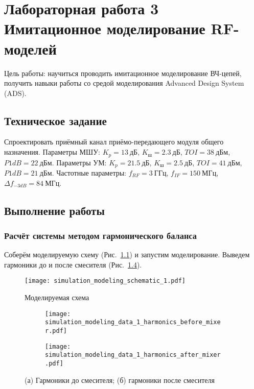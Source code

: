 \chapter{Лабораторная работа 3 \\
Имитационное моделирование RF-моделей}

Цель работы: научиться проводить имитационное моделирование ВЧ-цепей, получить навыки работы со средой моделирования Advanced Design System (ADS).

\section{Техническое задание}

Спроектировать приёмный канал приёмо-передающего модуля общего назначения.
Параметры МШУ: $K_p = 13~\text{дБ}$, $K_\text{ш} = 2.3~\text{дБ}$, $TOI = 38~\text{дБм}$, $P1dB = 22~\text{дБм}$.
Параметры УМ: $K_p = 21.5~\text{дБ}$, $K_\text{ш} = 2.5~\text{дБ}$, $TOI = 41~\text{дБм}$, $P1dB = 21~\text{дБм}$.
Частотные параметры: $f_{RF} = 3~\text{ГГц}$, $f_{IF} = 150~\text{МГц}$, $\Delta f_{-3dB} = 84~\text{МГц}$.

\section{Выполнение работы}

\subsection{Расчёт системы методом гармонического баланса}

Соберём моделируемую схему (Рис.~\ref{fig:simulation_modeling_schematic_1}) и запустим моделирование.
Выведем гармоники до и после смесителя (Рис.~\ref{fig:simulation_modeling_data_1}).

\begin{figure}[!ht]
    \centering
    \texttt{[image: simulation\_modeling\_schematic\_1.pdf]}
    \caption{Моделируемая схема}%
    \label{fig:simulation_modeling_schematic_1}
\end{figure}

\begin{figure}[!ht]
    \centering
    \begin{subfigure}[b]{0.7\textwidth}
        \centering
        \texttt{[image: simulation\_modeling\_data\_1\_harmonics\_before\_mixer.pdf]}
        \caption{}%
        \label{fig:simulation_modeling_data_1_harmonics_before_mixer}
    \end{subfigure}
    \vfill
    \begin{subfigure}[b]{0.7\textwidth}
        \centering
        \texttt{[image: simulation\_modeling\_data\_1\_harmonics\_after\_mixer.pdf]}
        \caption{}%
        \label{fig:simulation_modeling_data_1_harmonics_after_mixer}
    \end{subfigure}
        \caption{%
            (а) Гармоники до смесителя;
            (б) гармоники после смесителя
        }%
        \label{fig:simulation_modeling_data_1}
\end{figure}

